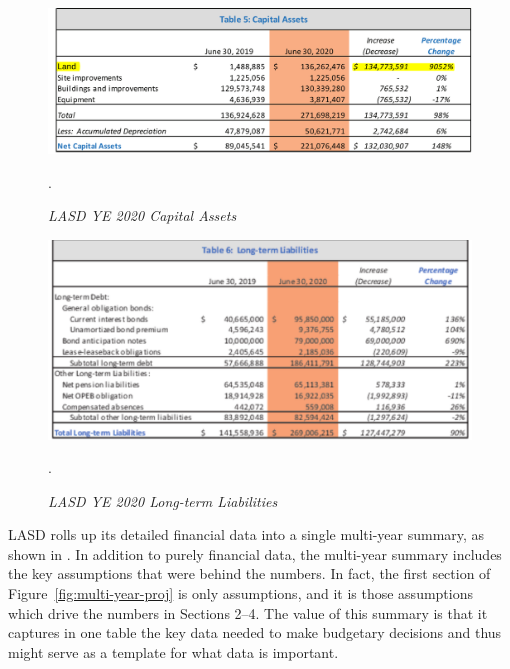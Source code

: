 \begin{figure}
  \centering
  \caption[LASD YE 2020 Capital Assets]{\textit{LASD YE 2020 Capital Assets}}\label{fig:Capital_Assets}
  \includegraphics[width=\textwidth]{CAFR-YE2020_Capital_Assets}\\
  \footnotesize\raggedright\textcite[10]{Kenyon2021}.
\end{figure}

\begin{figure}
  \centering
  \caption[LASD YE 2020 Long-term Liabilities]{\textit{LASD YE 2020 Long-term Liabilities}}\label{fig:Long-term_Liabilities}
  \includegraphics[width=\textwidth]{CAFR-YE2020_Long-term_Liabilities}\\
  \footnotesize\raggedright\textcite[11]{Kenyon2021}.
\end{figure}%

LASD rolls up its detailed financial data into a single multi-year summary, as shown in . In addition to purely financial data, the multi-year summary includes the key
assumptions that were behind the numbers. In fact, the first section of Figure~\ref{fig:multi-year-proj} is only assumptions, and it is those assumptions which drive the numbers in Sections 2–4. The value of this summary is that it captures in one table the key data needed to make budgetary decisions and thus might serve as a template for what data is important. 

